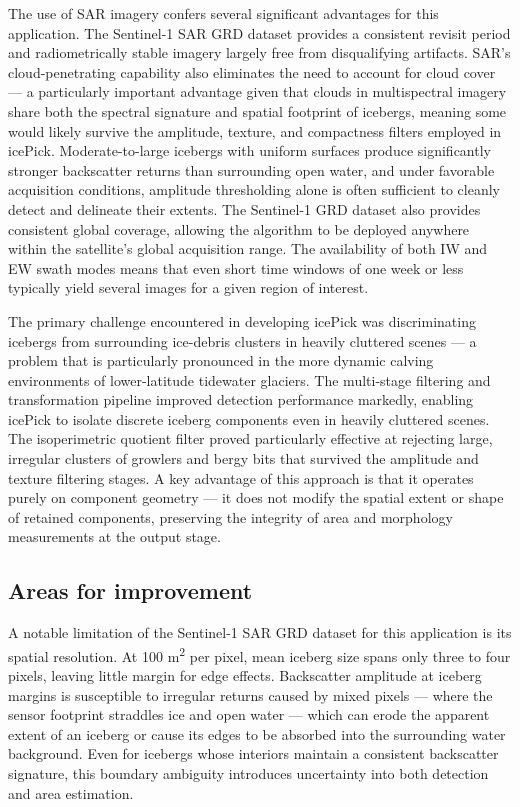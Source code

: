 \documentclass[11pt, letterpaper]{article}
\begin{document}
The use of SAR imagery confers several significant advantages for this application. The Sentinel-1 SAR GRD dataset provides a consistent revisit period and radiometrically stable imagery largely free from disqualifying artifacts. SAR's cloud-penetrating capability also eliminates the need to account for cloud cover --- a particularly important advantage given that clouds in multispectral imagery share both the
spectral signature and spatial footprint of icebergs, meaning some would likely survive the amplitude, texture, and compactness filters employed in icePick. Moderate-to-large icebergs with uniform surfaces produce significantly stronger backscatter returns than surrounding open water, and under favorable acquisition conditions, amplitude thresholding alone is often sufficient to cleanly detect
and delineate their extents. The Sentinel-1 GRD dataset also provides consistent global coverage, allowing the algorithm to be deployed anywhere within the satellite's global acquisition range. The availability of both IW and EW swath modes means that even short time windows of one week or less typically yield several images for a given region of interest.

The primary challenge encountered in developing icePick was discriminating icebergs from surrounding ice-debris clusters in heavily cluttered scenes --- a problem that is particularly pronounced in the more dynamic calving environments of lower-latitude tidewater glaciers. The multi-stage filtering and transformation pipeline improved detection performance markedly, enabling icePick to isolate discrete iceberg components even in heavily cluttered scenes. The isoperimetric quotient filter proved particularly effective at rejecting large, irregular clusters of growlers and bergy bits that survived the amplitude and texture filtering stages. A key advantage of this approach is that it operates purely on component geometry --- it does not modify the spatial extent or shape of retained components, preserving the integrity of area and morphology measurements at the output stage.

\subsection{Areas for improvement}
 
A notable limitation of the Sentinel-1 SAR GRD dataset for this application is its spatial resolution. At 100 m\textsuperscript{2} per pixel, mean iceberg size spans only three to four pixels, leaving little margin
for edge effects. Backscatter amplitude at iceberg margins is susceptible to irregular returns caused by mixed pixels --- where the sensor footprint straddles ice and open water --- which can erode the apparent extent of an iceberg or cause its edges to be absorbed into the surrounding water background. Even for icebergs whose interiors maintain a consistent backscatter signature, this boundary ambiguity introduces uncertainty into both detection and area estimation.
\end{document}

